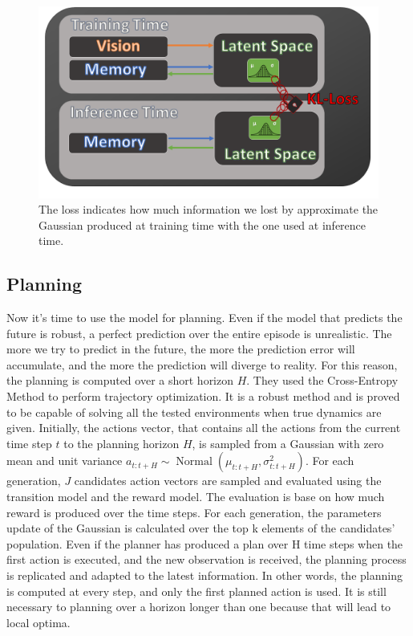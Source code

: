 \begin{figure}[H]
\centering
\includegraphics[width=1.\textwidth, height=.4\textheight]{pictures/kl_loss_chain}
\caption{ The loss indicates how much information we lost by approximate the Gaussian produced at training time with the one used at inference time. }
\end{figure}


\subsection{Planning}
Now it's time to use the model for planning. 
Even if the model that predicts the future is robust, a perfect prediction over the entire episode is unrealistic. 
The more we try to predict in the future, the more the prediction error will accumulate, and the more the prediction will diverge to reality.
For this reason, the planning is computed over a short horizon $H$.
They used the Cross-Entropy Method to perform trajectory optimization. It is a robust method and is proved to be capable of solving all the tested environments when true dynamics are given.
Initially, the actions vector, that contains all the actions from the current time step $t$ to the planning horizon $H$, is sampled from a Gaussian with zero mean and unit variance $a_{t: t+H} \sim \operatorname{Normal}\left(\mu_{t: t+H}, \sigma_{t: t+H}^{2} \right)$.
For each generation, $J$ candidates action vectors are sampled and evaluated using the transition model and the reward model.
The evaluation is base on how much reward is produced over the time steps.
For each generation, the parameters update of the Gaussian is calculated over the top k elements of the candidates' population.
Even if the planner has produced a plan over H time steps when the first action is executed, and the new observation is received, the planning process is replicated and adapted to the latest information.
In other words, the planning is computed at every step, and only the first planned action is used. 
It is still necessary to planning over a horizon longer than one because that will lead to local optima.

